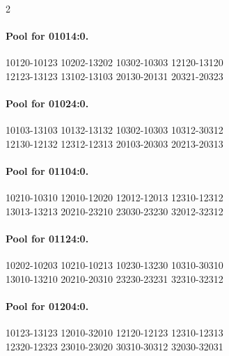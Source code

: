 \begin{multicols}{2}
\paragraph{Pool for 01014:0.}
\begingroup\footnotesize\ttfamily\begin{flushleft}
10120-10123 10202-13202 10302-10303 12120-13120\\
12123-13123 13102-13103 20130-20131 20321-20323\\
\end{flushleft}\endgroup
\paragraph{Pool for 01024:0.}
\begingroup\footnotesize\ttfamily\begin{flushleft}
10103-13103 10132-13132 10302-10303 10312-30312\\
12130-12132 12312-12313 20103-20303 20213-20313\\
\end{flushleft}\endgroup
\paragraph{Pool for 01104:0.}
\begingroup\footnotesize\ttfamily\begin{flushleft}
10210-10310 12010-12020 12012-12013 12310-12312\\
13013-13213 20210-23210 23030-23230 32012-32312\\
\end{flushleft}\endgroup
\paragraph{Pool for 01124:0.}
\begingroup\footnotesize\ttfamily\begin{flushleft}
10202-10203 10210-10213 10230-13230 10310-30310\\
13010-13210 20210-20310 23230-23231 32310-32312\\
\end{flushleft}\endgroup
\paragraph{Pool for 01204:0.}
\begingroup\footnotesize\ttfamily\begin{flushleft}
10123-13123 12010-32010 12120-12123 12310-12313\\
12320-12323 23010-23020 30310-30312 32030-32031\\
\end{flushleft}\endgroup

\end{multicols}
